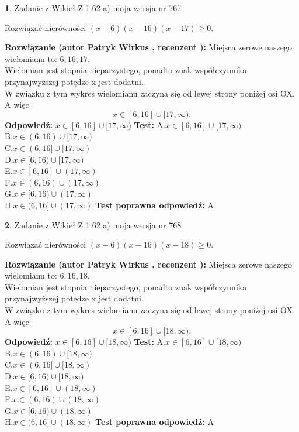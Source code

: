 \documentclass[12pt, a4paper]{article}
\theoremstyle{definition} %
\newtheorem{zad}{}
\newcommand{\zadStart}[1]{\begin{zad}#1\newline}
\newcommand{\zadStop}{\end{zad}}
\newcommand{\rozwStart}[2]{\noindent \textbf{Rozwiązanie (autor #1 , recenzent #2): }\newline}
\newcommand{\rozwStop}{\newline}
\newcommand{\odpStart}{\noindent \textbf{Odpowiedź:}\newline}
\newcommand{\odpStop}{\newline}
\newcommand{\testStart}{\noindent \textbf{Test:}\newline}
\newcommand{\testStop}{\newline}
\newcommand{\kluczStart}{\noindent \textbf{Test poprawna odpowiedź:}\newline}
\newcommand{\kluczStop}{\newline}
\begin{document}
\zadStart{Zadanie z Wikieł Z 1.62 a) moja wersja nr 767}

Rozwiązać nierówności $(x-6)(x-16)(x-17)\ge0$.
\zadStop
\rozwStart{Patryk Wirkus}{}
Miejsca zerowe naszego wielomianu to: $6, 16, 17$.\\
Wielomian jest stopnia nieparzystego, ponadto znak współczynnika przy\linebreak najwyższej potędze x jest dodatni.\\ W związku z tym wykres wielomianu zaczyna się od lewej strony poniżej osi OX. A więc $$x \in [6,16] \cup [17,\infty).$$
\rozwStop
\odpStart
$x \in [6,16] \cup [17,\infty)$
\odpStop
\testStart
A.$x \in [6,16] \cup [17,\infty)$\\
B.$x \in (6,16) \cup [17,\infty)$\\
C.$x \in (6,16] \cup [17,\infty)$\\
D.$x \in [6,16) \cup [17,\infty)$\\
E.$x \in [6,16] \cup (17,\infty)$\\
F.$x \in (6,16) \cup (17,\infty)$\\
G.$x \in [6,16) \cup (17,\infty)$\\
H.$x \in (6,16] \cup (17,\infty)$
\testStop
\kluczStart
A
\kluczStop



\zadStart{Zadanie z Wikieł Z 1.62 a) moja wersja nr 768}

Rozwiązać nierówności $(x-6)(x-16)(x-18)\ge0$.
\zadStop
\rozwStart{Patryk Wirkus}{}
Miejsca zerowe naszego wielomianu to: $6, 16, 18$.\\
Wielomian jest stopnia nieparzystego, ponadto znak współczynnika przy\linebreak najwyższej potędze x jest dodatni.\\ W związku z tym wykres wielomianu zaczyna się od lewej strony poniżej osi OX. A więc $$x \in [6,16] \cup [18,\infty).$$
\rozwStop
\odpStart
$x \in [6,16] \cup [18,\infty)$
\odpStop
\testStart
A.$x \in [6,16] \cup [18,\infty)$\\
B.$x \in (6,16) \cup [18,\infty)$\\
C.$x \in (6,16] \cup [18,\infty)$\\
D.$x \in [6,16) \cup [18,\infty)$\\
E.$x \in [6,16] \cup (18,\infty)$\\
F.$x \in (6,16) \cup (18,\infty)$\\
G.$x \in [6,16) \cup (18,\infty)$\\
H.$x \in (6,16] \cup (18,\infty)$
\testStop
\kluczStart
A
\kluczStop
\end{document}
